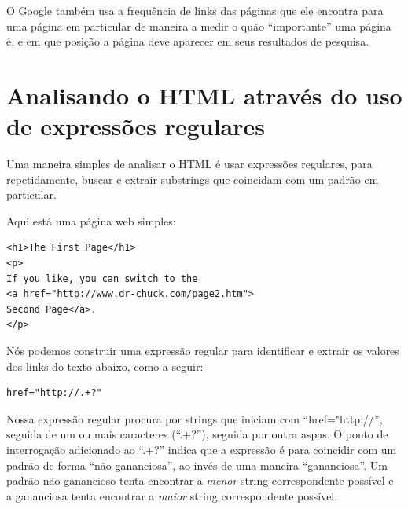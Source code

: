 O Google também usa a frequência de links das páginas que ele encontra para
uma página em particular de maneira a medir o quão ``importante'' uma página
é, e em que posição a página deve aparecer em seus resultados de pesquisa.

\section{Analisando o HTML através do uso de expressões regulares}

Uma maneira simples de analisar o HTML é usar expressões regulares, para
repetidamente, buscar e extrair substrings que coincidam com um padrão em
particular.

Aqui está uma página web simples:

\beforeverb
\begin{verbatim}
<h1>The First Page</h1>
<p>
If you like, you can switch to the
<a href="http://www.dr-chuck.com/page2.htm">
Second Page</a>.
</p>
\end{verbatim}
\afterverb

Nós podemos construir uma expressão regular para identificar e extrair os
valores dos links do texto abaixo, como a seguir:

\beforeverb
\begin{verbatim}
href="http://.+?"
\end{verbatim}
\afterverb

Nossa expressão regular procura por strings que iniciam com ``href="http://'',
seguida de um ou mais caracteres (``.+?''), seguida por outra aspas. O ponto
de interrogação adicionado ao ``.+?'' indica que a expressão é para coincidir
com um padrão de forma ``não gananciosa'', ao invés de uma maneira
``gananciosa''. Um padrão não ganancioso tenta encontrar a {\em menor} string
correspondente possível e a gananciosa tenta encontrar a {\em maior} string
correspondente possível.


